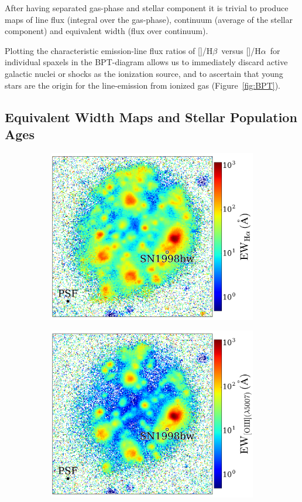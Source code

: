 \documentclass[traditabstract]{aa}
\newcommand{\hb}{H$\beta$}
\newcommand{\ha}{H$\alpha$}
\newcommand{\oiii}{[\ion{O}{iii}]}
\newcommand{\nii}{[\ion{N}{ii}]}
\begin{document}
After having separated gas-phase and stellar component it is trivial to produce maps of line flux (integral over the gas-phase), continuum (average of the stellar component) and equivalent width (flux over continuum). 

Plotting the characteristic emission-line flux ratios of \oiii/\hb\, versus \nii/\ha\, for individual spaxels in the BPT-diagram \citep{1981PASP...93....5B} allows us to immediately discard active galactic nuclei or shocks as the ionization source, and to ascertain that young stars are the origin for the line-emission from ionized gas (Figure~\ref{fig:BPT}).
\subsection{Equivalent Width Maps and Stellar Population Ages}
\begin{figure}
\begin{subfigure}{.242\textwidth}
  \includegraphics[width=1.0\linewidth]{Figs/MUSE_SN1998bw_HaEW.pdf}
\end{subfigure}
\begin{subfigure}{.242\textwidth}
  \includegraphics[width=1.0\linewidth]{Figs/MUSE_SN1998bw_OIIIEW.pdf}

\end{subfigure}
\end{figure}
\end{document}
